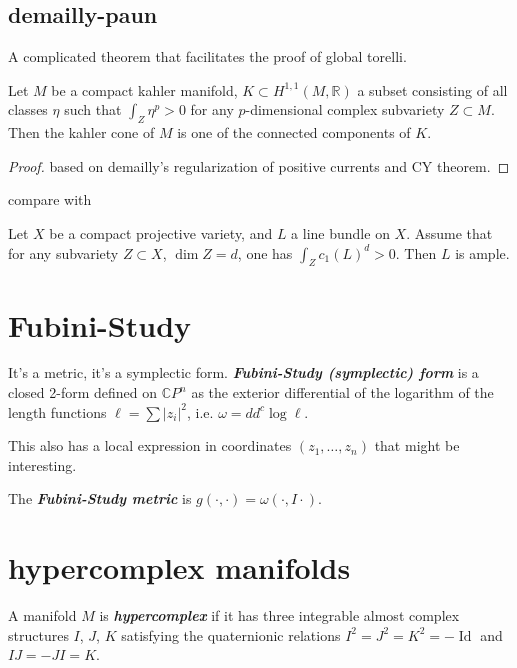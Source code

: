 \subsection{demailly-paun}
A complicated theorem that facilitates the proof of global torelli.
\begin{thm}\leavevmode
Let \(M\) be a compact kahler manifold,  \(K \subset H^{1,1}(M,\mathbb{R})\) a subset consisting of all classes \(\eta\) such that \(\int_Z \eta^p >0\) for any \(p\)-dimensional complex subvariety \(Z \subset M\). Then the kahler cone of \(M\) is one of the connected components of \(K\).
\end{thm}
\begin{proof}\leavevmode
based on demailly's regularization of positive currents and CY theorem.
\end{proof}
compare with
\begin{thm}\leavevmode
Let \(X\) be a compact projective variety, and \(L\) a line bundle on \(X\). Assume that for any subvariety \(Z \subset X\), \(\dim Z=d\), one has \(\int_Z c_1(L)^d>0\). Then \(L\) is ample.
\end{thm}


\section{Fubini-Study}
It's a metric, it's a symplectic form. \textit{\textbf{Fubini-Study (symplectic) form}} is a closed 2-form defined on \(\mathbb{C}P^{n}\) as the exterior differential of the logarithm of the length functions \(\ell=\sum |z_i|^2\), i.e. \(\omega=dd^c \operatorname{log} \ell\).

This also has a local expression in coordinates \((z_1,\ldots,z_n)\) that might be interesting.

The \textit{\textbf{Fubini-Study metric}} is \(g(\cdot ,\cdot )=\omega(\cdot ,I\cdot )\).

\section{hypercomplex manifolds}

\begin{defn}\leavevmode
	A manifold $M$ is \textit{\textbf{hypercomplex}} if it has three integrable almost complex structures  $I$,  $J$, $K$ satisfying the quaternionic relations $I^2=J^2=K^2=-\operatorname{Id}$ and $I J=-J I=K$.
\end{defn}

